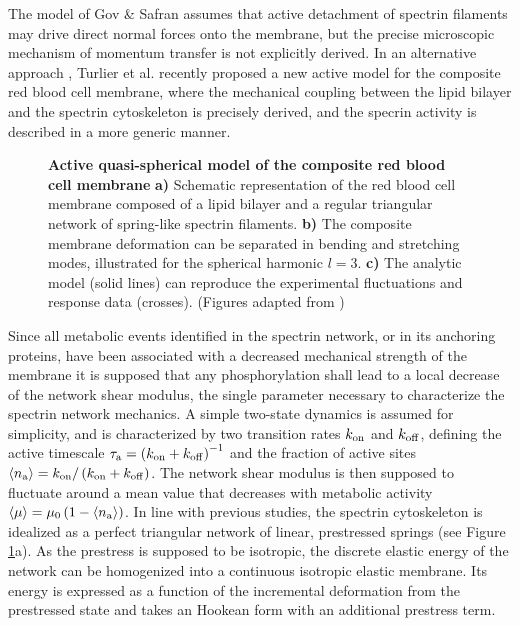 \documentclass[graybox]{svmult}
\begin{document}
The model of Gov \& Safran assumes that active detachment of spectrin filaments may drive direct normal forces onto the membrane, but the precise microscopic mechanism of momentum transfer is not explicitly derived. In an alternative approach \cite{Turlier:2016}, Turlier et al. recently proposed a new active model for the composite red blood cell membrane, where the mechanical coupling between the lipid bilayer and the spectrin cytoskeleton is precisely derived, and the specrin activity is described in a more generic manner. 

\begin{figure}[h!]
	\caption{\textbf{Active quasi-spherical model of the composite red blood cell membrane} \textbf{a)} Schematic representation of the red blood cell membrane composed of a lipid bilayer and a regular triangular network of spring-like spectrin filaments. \textbf{b)} The composite membrane deformation can be separated in bending and stretching modes, illustrated for the spherical harmonic $l = 3$. \textbf{c)} The analytic model (solid lines) can reproduce the experimental fluctuations and response data (crosses).  (Figures adapted from \cite{Turlier:2016}) }
	\label{fig:fig8}
\end{figure}	

Since all metabolic events identified in the spectrin network, or in its anchoring proteins, have been associated with a decreased mechanical strength of the membrane it is supposed that any phosphorylation shall lead to a local decrease of the network shear modulus, the single parameter necessary to characterize the spectrin network mechanics. A simple two-state dynamics is assumed for simplicity, and is characterized by two transition rates $k_{\rm{on}}$ and $k_{\rm{off}}$, defining the active timescale $\tau_{\rm{a}} = \left( k_{\rm{on}} + k_{\rm{off}} \right)^{-1}$ and the fraction of active sites $\left\langle n_{\rm{a}}\right\rangle = k_{\rm{on}}/\left( k_{\rm{on}} + k_{\rm{off}} \right)$. The network shear modulus is then supposed to fluctuate around a mean value that decreases with metabolic activity $\left\langle \mu \right\rangle = \mu_0\left(1 - \left\langle n_{\rm{a}}\right\rangle\right)$.
In line with previous studies, the spectrin cytoskeleton is idealized as a perfect triangular network of linear, prestressed springs (see Figure \ref{fig:fig8}a). As the prestress is supposed to be isotropic, the discrete elastic energy of the network can be homogenized into a continuous isotropic elastic membrane. Its energy is expressed as a function of the incremental deformation from the prestressed state and takes an Hookean form with an additional prestress term. 
\end{document}
